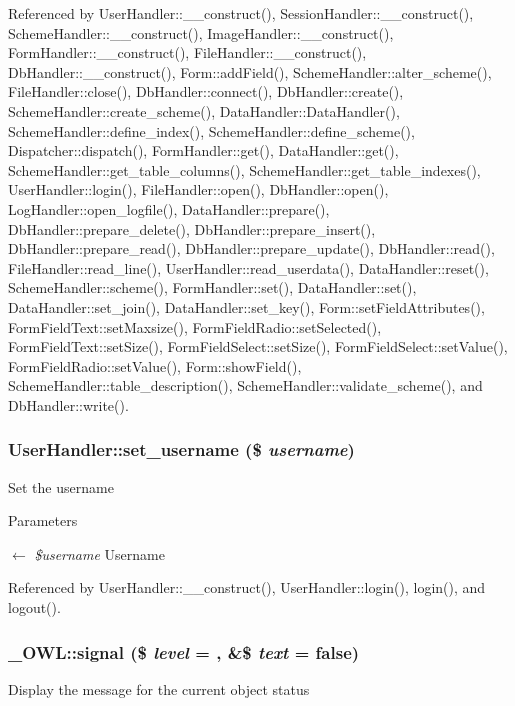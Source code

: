 Referenced by UserHandler::\_\-\_\-construct(), SessionHandler::\_\-\_\-construct(), SchemeHandler::\_\-\_\-construct(), ImageHandler::\_\-\_\-construct(), FormHandler::\_\-\_\-construct(), FileHandler::\_\-\_\-construct(), DbHandler::\_\-\_\-construct(), Form::addField(), SchemeHandler::alter\_\-scheme(), FileHandler::close(), DbHandler::connect(), DbHandler::create(), SchemeHandler::create\_\-scheme(), DataHandler::DataHandler(), SchemeHandler::define\_\-index(), SchemeHandler::define\_\-scheme(), Dispatcher::dispatch(), FormHandler::get(), DataHandler::get(), SchemeHandler::get\_\-table\_\-columns(), SchemeHandler::get\_\-table\_\-indexes(), UserHandler::login(), FileHandler::open(), DbHandler::open(), LogHandler::open\_\-logfile(), DataHandler::prepare(), DbHandler::prepare\_\-delete(), DbHandler::prepare\_\-insert(), DbHandler::prepare\_\-read(), DbHandler::prepare\_\-update(), DbHandler::read(), FileHandler::read\_\-line(), UserHandler::read\_\-userdata(), DataHandler::reset(), SchemeHandler::scheme(), FormHandler::set(), DataHandler::set(), DataHandler::set\_\-join(), DataHandler::set\_\-key(), Form::setFieldAttributes(), FormFieldText::setMaxsize(), FormFieldRadio::setSelected(), FormFieldText::setSize(), FormFieldSelect::setSize(), FormFieldSelect::setValue(), FormFieldRadio::setValue(), Form::showField(), SchemeHandler::table\_\-description(), SchemeHandler::validate\_\-scheme(), and DbHandler::write().

\subsubsection[{set\_\-username}]{\setlength{\rightskip}{0pt plus 5cm}UserHandler::set\_\-username (\$ {\em username})}\label{classUserHandler_afbcc9a275b547cca0bd4cff567b054a0}
Set the username 
\begin{DoxyParams}{Parameters}
\item[\mbox{$\leftarrow$} {\em \$username}]Username \end{DoxyParams}


Referenced by UserHandler::\_\-\_\-construct(), UserHandler::login(), login(), and logout().

\subsubsection[{signal}]{\setlength{\rightskip}{0pt plus 5cm}\_\-OWL::signal (\$ {\em level} = {}, \/  \&\$ {\em text} = {\ttfamily false})}\label{class__OWL_a51ba4a16409acf2a2f61f286939091a5}
Display the message for the current object status


